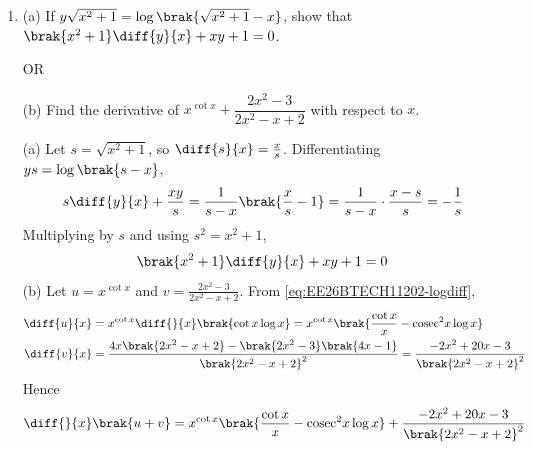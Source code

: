 \begin{enumerate}[label=\thesubsection.\arabic*, ref=\thesubsection.\theenumi, start=32]
\item 
(a) If $y\sqrt{x^2+1} = \log\brak{\sqrt{x^2+1}-x}$, show that $\brak{x^2+1}\diff{y}{x} + xy + 1 = 0$.

OR

(b) Find the derivative of $x^{\cot x} + \dfrac{2x^2-3}{2x^2-x+2}$ with respect to $x$.
\par\solution
(a) Let $s = \sqrt{x^2+1}$, so $\diff{s}{x} = \frac{x}{s}$. Differentiating $ys = \log\brak{s-x}$,
\begin{align}
	s\diff{y}{x} + \frac{xy}{s} = \frac{1}{s-x}\brak{\frac{x}{s} - 1} = \frac{1}{s-x}\cdot\frac{x-s}{s} = -\frac{1}{s}
\end{align}
Multiplying by $s$ and using $s^2 = x^2+1$,
\begin{align}
	\brak{x^2+1}\diff{y}{x} + xy + 1 = 0
\end{align}
(b) Let $u = x^{\cot x}$ and $v = \frac{2x^2-3}{2x^2-x+2}$. From \eqref{eq:EE26BTECH11202-logdiff},
\begin{align}
	\diff{u}{x} &= x^{\cot x}\diff{}{x}\brak{\cot x\log x} = x^{\cot x}\brak{\frac{\cot x}{x} - \text{cosec}^2 x\log x}
	\\
	\diff{v}{x} &= \frac{4x\brak{2x^2-x+2} - \brak{2x^2-3}\brak{4x-1}}{\brak{2x^2-x+2}^2}
	= \frac{-2x^2+20x-3}{\brak{2x^2-x+2}^2}
\end{align}
Hence
\begin{align}
	\diff{}{x}\brak{u+v} = x^{\cot x}\brak{\frac{\cot x}{x} - \text{cosec}^2 x\log x} + \frac{-2x^2+20x-3}{\brak{2x^2-x+2}^2}
\end{align}


\end{enumerate}
